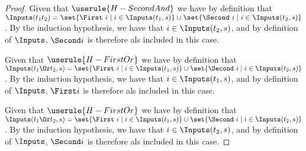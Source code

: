 \begin{proof}
       {Given that $\userule{H-SecondAnd}$ we have by definition that $\Inputs(t_1\And t_2) = \set{\First\ i \mid i \in \Inputs(t_1,s)} \cup \set{\Second\ i \mid i \in \Inputs(t_2,s)}$.
       By the induction hypothesis, we have that $i\in\Inputs(t_2,s)$, and by definition of $\Inputs$, $\Second i$ is therefore als included in this case.}

       {Given that $\userule{H-FirstOr}$ we have by definition that $\Inputs(t_1\Or t_2,s) = \set{\First\ i \mid i \in \Inputs(t_1,s)} \cup \set{\Second\ i \mid i \in \Inputs(t_2,s)}$.
       By the induction hypothesis, we have that $i\in\Inputs(t_1,s)$, and by definition of $\Inputs$, $\First i$ is therefore als included in this case.}

       {Given that $\userule{H-FirstOr}$ we have by definition that $\Inputs(t_1\Or t_2,s) = \set{\First\ i \mid i \in \Inputs(t_1,s)} \cup \set{\Second\ i \mid i \in \Inputs(t_2,s)}$.
       By the induction hypothesis, we have that $i\in\Inputs(t_2,s)$, and by definition of $\Inputs$, $\Second i$ is therefore als included in this case.}
\end{proof}
